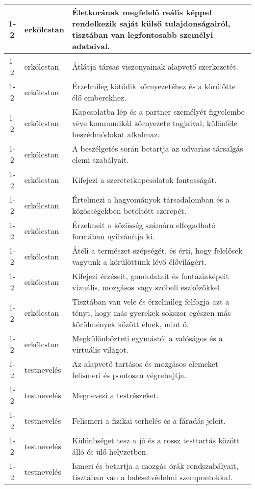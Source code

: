 \begin{small}
\begin{longtable}{c | p{2cm} |  p{11cm} }
              1-2 & erkölcstan & Életkorának megfelelő reális képpel rendelkezik saját külső tulajdonságairól, tisztában van legfontosabb személyi adataival. \\ \hline
              1-2 & erkölcstan & Átlátja társas viszonyainak alapvető szerkezetét. \\ \hline
              1-2 & erkölcstan & Érzelmileg kötődik környezetéhez és a körülötte élő emberekhez. \\ \hline
              1-2 & erkölcstan & Kapcsolatba lép és a partner személyét figyelembe véve kommunikál környezete tagjaival, különféle beszédmódokat alkalmaz. \\ \hline
              1-2 & erkölcstan & A beszélgetés során betartja az udvarias társalgás elemi szabályait. \\ \hline
              1-2 & erkölcstan & Kifejezi a szeretetkapcsolatok fontosságát. \\ \hline
              1-2 & erkölcstan & Értelmezi a hagyományok társadalomban és a közösségekben betöltött szerepét. \\ \hline
              1-2 & erkölcstan & Érzelmeit a közösség számára elfogadható formában nyilvánítja ki. \\ \hline
              1-2 & erkölcstan & Átéli a természet szépségét, és érti, hogy felelősek vagyunk a körülöttünk lévő élővilágért. \\ \hline
              1-2 & erkölcstan & Kifejezi érzéseit, gondolatait és fantáziaképeit vizuális, mozgásos vagy szóbeli eszközökkel. \\ \hline
              1-2 & erkölcstan & Tisztában van vele és érzelmileg felfogja azt a tényt, hogy más gyerekek sokszor egészen más körülmények között élnek, mint ő. \\ \hline
              1-2 & erkölcstan & Megkülönbözteti egymástól a valóságos és a virtuális világot. \\ \hline
              1-2 & testnevelés & Az alapvető tartásos és mozgásos elemeket felismeri és pontosan végrehajtja. \\ \hline
              1-2 & testnevelés & Megnevezi a testrészeket. \\ \hline
              1-2 & testnevelés & Felismeri a fizikai terhelés és a fáradás jeleit. \\ \hline
              1-2 & testnevelés & Különbséget tesz a jó és a rossz testtartás között álló és ülő helyzetben. \\ \hline
              1-2 & testnevelés & Ismeri és betartja a mozgás órák rendszabályait, tisztában van a balesetvédelmi szempontokkal. \\ \hline

\end{longtable}
\end{small}
